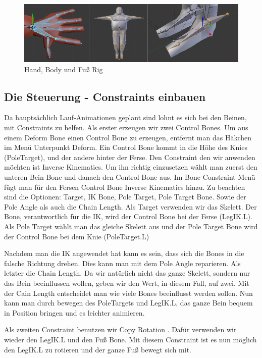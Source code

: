 \begin{figure}[H]
    \centering

    \includegraphics[width=.8\textwidth]{images/rigging_umsetzung.png}
    \caption{Hand, Body und Fuß Rig}
\end{figure}

\subsection{Die Steuerung - Constraints einbauen}
Da hauptsächlich Lauf-Animationen geplant sind lohnt es sich bei den Beinen, mit Constraints zu helfen.
Als erster erzeugen wir zwei Control Bones. Um aus einem Deform Bone einen Control Bone zu erzeugen, entfernt man das Häkchen im Menü Unterpunkt
\dq Deform\dq. Ein Control Bone kommt in die Höhe des Knies (PoleTarget), und der andere hinter der Ferse. Den Constraint den wir anwenden möchten ist
\dq Inverse Kinematics\dq. Um ihn richtig einzusetzen wählt man zuerst den unteren Bein Bone und danach den Control Bone aus. Im Bone Constraint Menü fügt man für den Fersen Control Bone
Inverse Kinematics hinzu. Zu beachten sind die Optionen: Target, IK Bone, Pole Target, Pole Target Bone. Sowie der Pole Angle als auch die Chain Length. Als Target verwenden wir das Skelett.
Der Bone, verantwortlich für die IK,
wird der Control Bone bei der Ferse (LegIK.L). Als Pole Target wählt man das gleiche Skelett aus und der Pole Target Bone wird der Control Bone bei dem Knie (PoleTarget.L)

Nachdem man die IK angewendet hat kann es sein, dass sich die Bones in die falsche Richtung drehen.
Dies kann man mit dem Pole Angle reparieren. Als letzter die Chain Length. Da wir natürlich nicht das ganze Skelett, sondern nur das Bein beeinflussen wollen, geben wir den Wert,
in diesem Fall, auf zwei. Mit der Cain Length entscheidet man wie viele Bones beeinflusst werden sollen.
Nun kann man durch bewegen des PoleTargets und LegIK.L, das ganze Bein bequem in Position bringen und es leichter animieren.

Als zweiten Constraint benutzen wir \dq Copy Rotation \dq.
Dafür verwenden wir wieder den LegIK.L und den Fuß Bone. Mit diesem Constraint ist es nun möglich den LegIK.L zu rotieren und der ganze Fuß bewegt sich mit.

